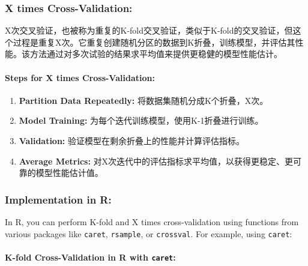 \documentclass[
]{article}
\begin{document}
\hypertarget{x-times-cross-validation}{%
\subsubsection{X times
Cross-Validation:}\label{x-times-cross-validation}}

X次交叉验证，也被称为重复的K-fold交叉验证，类似于K-fold的交叉验证，但这个过程是重复X次。它重复创建随机分区的数据到K折叠，训练模型，并评估其性能。该方法通过对多次试验的结果求平均值来提供更稳健的模型性能估计。

\hypertarget{steps-for-x-times-cross-validation}{%
\paragraph{Steps for X times
Cross-Validation:}\label{steps-for-x-times-cross-validation}}

\begin{enumerate}
\def\labelenumi{\arabic{enumi}.}
\item
  \textbf{Partition Data Repeatedly:} 将数据集随机分成K个折叠，X次。
\item
  \textbf{Model Training:} 为每个迭代训练模型，使用K-1折叠进行训练。
\item
  \textbf{Validation:} 验证模型在剩余折叠上的性能并计算评估指标。
\item
  \textbf{Average Metrics:}
  对X次迭代中的评估指标求平均值，以获得更稳定、更可靠的模型性能估计值。
\end{enumerate}

\hypertarget{implementation-in-r}{%
\subsubsection{Implementation in R:}\label{implementation-in-r}}

In R, you can perform K-fold and X times cross-validation using
functions from various packages like \texttt{caret}, \texttt{rsample},
or \texttt{crossval}. For example, using \texttt{caret}:

\hypertarget{k-fold-cross-validation-in-r-with-caret}{%
\paragraph{\texorpdfstring{K-fold Cross-Validation in R with
\texttt{caret}:}{K-fold Cross-Validation in R with caret:}}\label{k-fold-cross-validation-in-r-with-caret}}
\end{document}
